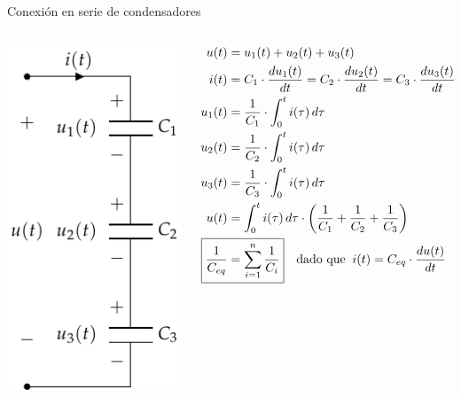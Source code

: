 \documentclass[aspectratio=169, xcolor={usenames,svgnames,dvipsnames}]{beamer}
\begin{document}
\begin{frame}{Conexión en serie de condensadores}
    \begin{columns}
    \begin{column}{0.3\columnwidth}
    \begin{center}
    \includegraphics[height=0.85\textheight]{../figs/CondensadoresSerie.pdf}
    \end{center}
    \end{column}
    \begin{column}{0.7\columnwidth}
    \begin{align*}
      u(t) & = u_1(t) + u_2(t) + u_3(t)\\
      i(t) &= C_1 \cdot \frac{du_1(t)}{dt}= C_2 \cdot \frac{du_2(t)}{dt}= C_3 \cdot \frac{du_3(t)}{dt}\\
      u_1(t)&=\dfrac{1}{C_1}\cdot\int_{0}^{t} i(\tau)\, d\tau\\
      u_2(t)&=\dfrac{1}{C_2}\cdot\int_{0}^{t} i(\tau)\, d\tau\\
      u_3(t)&=\dfrac{1}{C_3}\cdot\int_{0}^{t} i(\tau)\, d\tau\\
      u(t)& = \int_{0}^{t} i(\tau)\,d\tau \cdot \left(\dfrac{1}{C_1}+\dfrac{1}{C_2}+\dfrac{1}{C_3}\right)\\
      \Aboxed{\frac{1}{C_{eq}} &= \sum_{i = 1}^n \frac{1}{C_i}} \quad \textrm{dado que} \;\; i(t) = C_{eq} \cdot \frac{du(t)}{dt}
    \end{align*}
    \end{column}
    \end{columns}
\end{frame}
\end{document}

